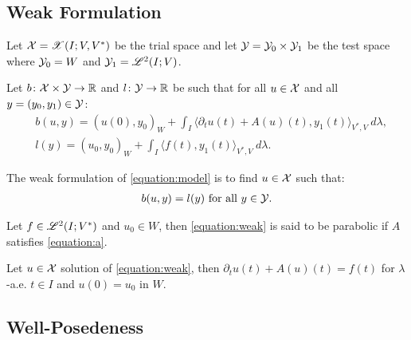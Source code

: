 \newpage
\subsection{Weak Formulation}

\begin{definition}
    Let $\mathcal{X} = \mathscr{X}(I; V, V^*)$ be the trial space and let $\mathcal{Y} = \mathcal{Y}_0 \times \mathcal{Y}_1$ be the test space where $\mathcal{Y}_0 = W$ and $\mathcal{Y}_1 = \mathscr{L}^{2}(I; V)$.
\end{definition}

\begin{definition}[$b$ and $l$]
    Let $b \colon \mathcal{X} \times \mathcal{Y} \rightarrow \mathbb{R}$ and $l \colon \mathcal{Y} \rightarrow \mathbb{R}$ be such that for all $u \in \mathcal{X}$ and all $y = (y_0, y_1) \in \mathcal{Y}$:
    \begin{align}
        & b(u, y) = \left( u(0), y_0 \right)_W + \int_I \langle \partial_t u(t) + A(u)(t), y_1(t) \rangle_{V^*, V} ~ d \lambda, \\
        & l(y) = \left( u_0, y_0 \right)_W + \int_I \langle f(t), y_1(t) \rangle_{V^*, V} ~ d \lambda.
    \end{align}
\end{definition}

\begin{definition}
    The weak formulation of \ref{equation:model} is to find $u \in \mathcal{X}$ such that:
    \begin{gather}
        b(u, y) = l(y) \text{ for all } y \in \mathcal{Y}. \label{equation:weak}
    \end{gather}
\end{definition}

\begin{definition}
    Let $f \in \mathscr{L}^{2}(I; V^*)$ and $u_0 \in W$, then \eqref{equation:weak} is said to be parabolic if $A$ satisfies \eqref{equation:a}.
\end{definition}

\begin{lemma}
    Let $u \in \mathcal{X}$ solution of \eqref{equation:weak}, then $\partial_t u(t) + A(u)(t) = f(t)$ for $\lambda$-a.e. $t \in I$ and $u(0) = u_0$ in $W$.
\end{lemma}

\newpage
\subsection{Well-Posedeness}

